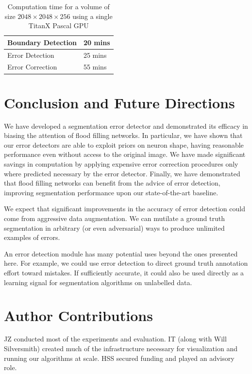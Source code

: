 \documentclass{article}
\begin{document}
\begin{table}[h]
	\caption{Computation time for a volume of size $2048\times 2048\times 256$ using a single TitanX Pascal GPU}
\label{table:timing}
  \centering
  \begin{tabular}{ll}
	  \toprule
	Boundary Detection & 20 mins\\
	\midrule
	Error Detection & 25 mins\\
	\midrule
	Error Correction & 55 mins\\
	\bottomrule
  \end{tabular}
\end{table}

\section{Conclusion and Future Directions}
We have developed a segmentation error detector and demonstrated its efficacy in biasing the attention of flood filling networks. In particular, we have shown that our error detectors are able to exploit priors on neuron shape, having reasonable performance even without access to the original image. We have made significant savings in computation by applying expensive error correction procedures only where predicted necessary by the error detector. Finally, we have demonstrated that flood filling networks can benefit from the advice of error detection, improving segmentation performance upon our state-of-the-art baseline.

We expect that significant improvements in the accuracy of error detection could come from aggressive data augmentation. We can mutilate a ground truth segmentation in arbitrary (or even adversarial) ways to produce unlimited examples of errors.

An error detection module has many potential uses beyond the ones presented here. For example, we could use error detection to direct ground truth annotation effort toward mistakes. If sufficiently accurate, it could also be used directly as a learning signal for segmentation algorithms on unlabelled data.

\section{Author Contributions}
JZ conducted most of the experiments and evaluation. IT (along with
Will Silversmith) created much of the infrastructure necessary for visualization and running
our algorithms at scale. HSS secured funding and played an advisory role.
\end{document}
